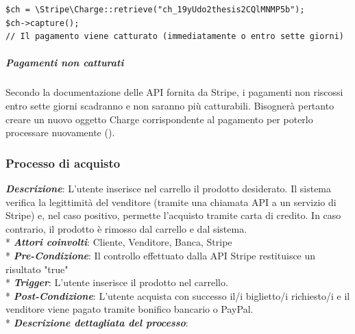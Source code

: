 \begin{lstlisting}[caption={cattura di un pagamento tramite le API Stripe}]
$ch = \Stripe\Charge::retrieve("ch_19yUdo2thesis2CQlMNMP5b");
$ch->capture();
// Il pagamento viene catturato (immediatamente o entro sette giorni)
\end{lstlisting}

\subparagraph{Pagamenti non catturati}
Secondo la documentazione delle API fornita da Stripe, i pagamenti non riscossi entro sette giorni scadranno e non saranno più catturabili. Bisognerà pertanto creare un nuovo oggetto Charge corrispondente al pagamento per poterlo processare nuovamente (\cite{stripedoc}). 
\subsubsection{Processo di acquisto} \label{acquisto}
\textbf{\textit{Descrizione}}: L'utente inserisce nel carrello il prodotto desiderato. Il sistema verifica la legittimità del venditore (tramite una chiamata API a un servizio di Stripe) e, nel caso positivo, permette l'acquisto tramite carta di credito. In caso contrario, il prodotto è rimosso dal carrello e dal sistema. \\*
\textbf{\textit{Attori coinvolti}}: Cliente, Venditore, Banca, Stripe \\*
\textbf{\textit{Pre-Condizione}}: Il controllo effettuato dalla API Stripe restituisce un risultato "true" \\*
\textbf{\textit{Trigger}}: L'utente inserisce il prodotto nel carrello. \\*
\textbf{\textit{Post-Condizione}}: L'utente acquista con successo il/i biglietto/i richiesto/i e il venditore viene pagato tramite bonifico bancario o PayPal. \\*
\textbf{\textit{Descrizione dettagliata del processo}}: 

